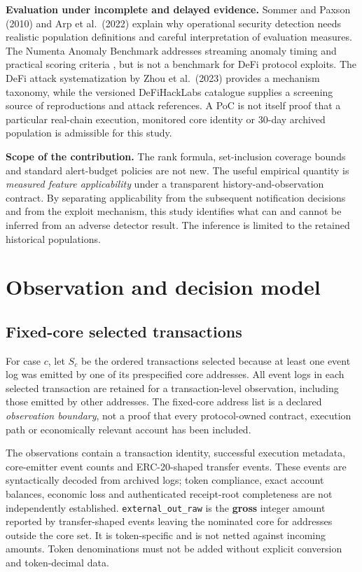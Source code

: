 \documentclass[preprint,12pt,authoryear]{elsarticle}
\begin{document}
\textbf{Evaluation under incomplete and delayed evidence.} Sommer and Paxson (2010) and Arp et al.~(2022) explain why operational security detection needs realistic population definitions and careful interpretation of evaluation measures. The Numenta Anomaly Benchmark addresses streaming anomaly timing and practical scoring criteria \citep{Lavin2015NAB}, but is not a benchmark for DeFi protocol exploits. The DeFi attack systematization by Zhou et al.~(2023) provides a mechanism taxonomy, while the versioned DeFiHackLabs catalogue supplies a screening source of reproductions and attack references. A PoC is not itself proof that a particular real-chain execution, monitored core identity or 30-day archived population is admissible for this study.

\textbf{Scope of the contribution.} The rank formula, set-inclusion coverage bounds and standard alert-budget policies are not new. The useful empirical quantity is \emph{measured feature applicability} under a transparent history-and-observation contract. By separating applicability from the subsequent notification decisions and from the exploit mechanism, this study identifies what can and cannot be inferred from an adverse detector result. The inference is limited to the retained historical populations.

\section{Observation and decision model}\label{observation-and-decision-model}

\subsection{Fixed-core selected transactions}\label{fixed-core-selected-transactions}

For case \(c\), let \(S_c\) be the ordered transactions selected because at least one event log was emitted by one of its prespecified core addresses. All event logs in each selected transaction are retained for a transaction-level observation, including those emitted by other addresses. The fixed-core address list is a declared \emph{observation boundary}, not a proof that every protocol-owned contract, execution path or economically relevant account has been included.

The observations contain a transaction identity, successful execution metadata, core-emitter event counts and ERC-20-shaped transfer events. These events are syntactically decoded from archived logs; token compliance, exact account balances, economic loss and authenticated receipt-root completeness are not independently established. \texttt{external\_out\_raw} is the \textbf{gross} integer amount reported by transfer-shaped events leaving the nominated core for addresses outside the core set. It is token-specific and is not netted against incoming amounts. Token denominations must not be added without explicit conversion and token-decimal data.
\end{document}
